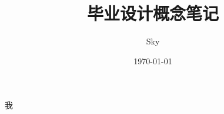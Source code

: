 \documentclass[a4paper, 12pt]{book}
\title{毕业设计概念笔记}
\author{Sky}
\date{\today}
\begin{document}
    \tableofcontents
    \frontmatter
    
    
    我\cite{einstein1905}

    \mainmatter
    
    

    \backmatter
    
    

    
\end{document}
